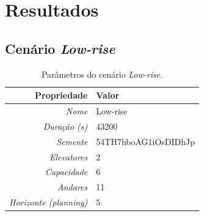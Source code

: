 \chapter{\label{chap:results}Resultados}

\section{Cenário \textit{Low-rise}}

\lipsum[1]

\begin{table}[htb!]
\centering
\caption{Parâmetros do cenário \textit{Low-rise}.}
\label{tab:results:lowrise:params}
\begin{tabular}{|r|l|}
\hline
\textbf{Propriedade}          & \textbf{Valor}       \\ \hline
\textit{Nome}                 & Low-rise             \\ \hline
\textit{Duração (s)}          & 43200                \\ \hline
\textit{Semente}              & 54TH7hboAG1iOsDIDhJp \\ \hline
\textit{Elevatores}           & 2                    \\ \hline
\textit{Capacidade}           & 6                    \\ \hline
\textit{Andares}              & 11                   \\ \hline
\textit{Horizonte (planning)} & 5                    \\ \hline
\end{tabular}
\end{table}

